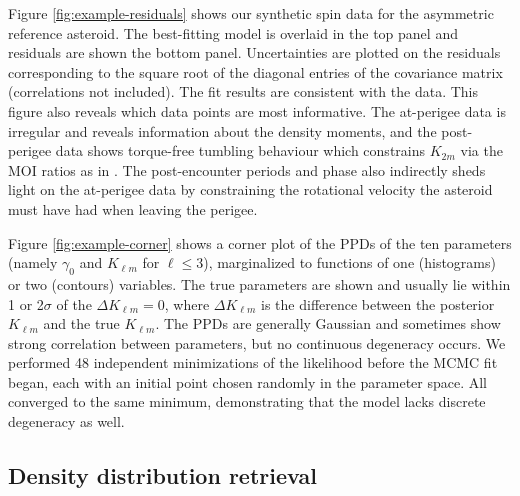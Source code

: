 \documentclass[fleqn,usenatbib]{mnras}
\begin{document}
Figure \ref{fig:example-residuals} shows our synthetic spin data for the asymmetric reference asteroid. The best-fitting model is overlaid in the top panel and residuals are shown the bottom panel. Uncertainties are plotted on the residuals corresponding to the square root of the diagonal entries of the covariance matrix (correlations not included). The fit results are consistent with the data. This figure also reveals which data points are most informative. The at-perigee data is irregular and reveals information about the density moments, and the post-perigee data shows torque-free tumbling behaviour which constrains $K_{2m}$ via the MOI ratios as in \cite{MOSKOVITZ2020113519}. The post-encounter periods and phase also indirectly sheds light on the at-perigee data by constraining the rotational velocity the asteroid must have had when leaving the perigee.

Figure \ref{fig:example-corner} shows a corner plot of the PPDs of the ten parameters (namely $\gamma_0$ and $K_{\ell m}$ for $\ell \leq 3$), marginalized to functions of one (histograms) or two (contours) variables. The true parameters are shown and usually lie within 1 or 2$\sigma$ of the $\Delta K_{\ell m} = 0$, where $\Delta K_{\ell m}$ is the difference between the posterior $K_{\ell m}$ and the true $K_{\ell m}$. The PPDs are generally Gaussian and sometimes show strong correlation between parameters, but no continuous degeneracy occurs. We performed 48 independent minimizations of the likelihood before the MCMC fit began, each with an initial point chosen randomly in the parameter space. All converged to the same minimum, demonstrating that the model lacks discrete degeneracy as well.



\subsection{Density distribution retrieval}
\label{sec:asym-density}
\end{document}
